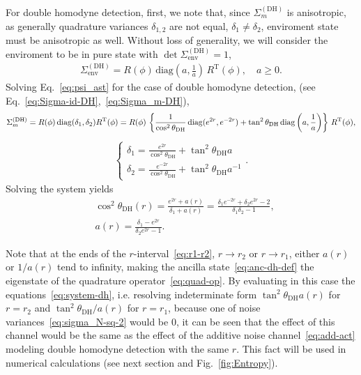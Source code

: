 \documentclass{nsart_eng3}
\newcommand{\tcnj}[1]{{#1}^{\mathrm{T}}}
\newcommand{\diag}{\mathop{\rm diag}\nolimits}
\newcommand{\ind}[1]{\mathrm{#1}}
\begin{document}
For double homodyne detection, first, we note that, since $\Sigma_m^{(\ind{DH})}$ is anisotropic, as generally quadrature variances $\delta_{1,2}$ are not equal, $\delta_1\neq\delta_2$, enviroment state must be anisotropic as well. Without loss of generality, we will consider the enviroment to be in pure state with $\det\Sigma_{\ind{env}}^{(\ind{DH})}=1$,
\begin{align}
  \label{eq:anc-dh-def}
    \Sigma_{\ind{env}}^{(\ind{DH})}=R(\phi)\,\ind{diag}\left(a,\frac1a\right)\,{R}^{\ind{T}}(\phi),\quad a\geq0.
\end{align}
Solving Eq.~\eqref{eq:psi_ast} for the case of double homodyne detection, (see Eq.~\eqref{eq:Sigma-id-DH},~\eqref{eq:Sigma_m-DH}),
\begin{align}
  \Sigma_{m}^{(\ind{DH})}=
  R(\phi)\diag(\delta_1,\delta_2)\tcnj{R}(\phi)
  =R(\phi)\,\left\{
    \frac{1}{\cos^2\theta_{\ind{DH}}}\,\ind{diag}(e^{2r},e^{-2r})
    +
    \tan^2\theta_{\ind{DH}}\,\ind{diag}\left(a,\frac{1}{a}\right)
    \right\}\,{R}^{\ind{T}}(\phi),
\end{align}
\begin{align}
    \label{eq:system-dh}
    \begin{cases}
        \delta_1=\frac{e^{2r}}{\cos^2\theta_{\ind{DH}}}+\tan^2\theta_{\ind{DH}} a\\
        \delta_2=\frac{e^{-2r}}{\cos^2\theta_{\ind{DH}}}+\tan^2\theta_{\ind{DH}} a^{-1}
    \end{cases}.
  \end{align}
Solving the system yields
\begin{align}
    \label{eq:cos-theta-dh}
    &\cos^2\theta_{\ind{DH}}(r)={\frac{e^{2r}+a(r)}{\delta_1+a(r)}}=
    \frac{\delta_1 e^{-2r}+\delta_2e^{2r}-2}{\delta_1\delta_2-1}
    ,\\
    \label{eq:a_def}
    &a(r)=\frac{\delta_{1}-e^{2 r}}{\delta_{2} e^{2 r}-1}.%
\end{align}

Note that at the ends of the $r$-interval~\eqref{eq:r1-r2}, $r\to r_2$ or $r\to r_1$, either $a(r)$ or $1/a(r)$ tend to infinity, making the ancilla state~\eqref{eq:anc-dh-def} the eigenstate of the quadrature operator~\eqref{eq:quad-op}. By evaluating in this case the equations~\eqref{eq:system-dh}, i.e. resolving indeterminate form $\tan^2\theta_{\ind{DH}} a(r)$ for $r=r_2$ and $\tan^2\theta_{\ind{DH}}/a(r)$ for $r=r_1$, because one of noise variances~\eqref{eq:sigma_N-sq-2} would be $0$, it can be seen that the effect of this channel would be the same as the effect of the additive noise channel~\eqref{eq:add-act} modeling double homodyne detection with the same $r$. This fact will be used in numerical calculations (see next section and Fig.~\ref{fig:Entropy}).
\end{document}
